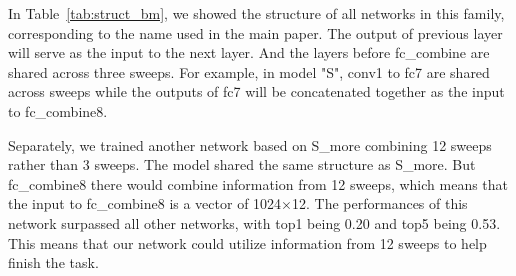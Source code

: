 In Table~\ref{tab:struct_bm}, we showed the structure of all networks in this family, corresponding to the name used in the main paper.
The output of previous layer will serve as the input to the next layer.
And the layers before fc\_combine are shared across three sweeps. For example, in model "S", conv1 to fc7 are shared across sweeps while the outputs of fc7 will be concatenated together as the input to fc\_combine8.

Separately, we trained another network based on S\_more combining 12 sweeps rather than 3 sweeps. The model shared the same structure as S\_more. 
But fc\_combine8 there would combine information from 12 sweeps, which means that the input to fc\_combine8 is a vector of 1024$\times$12. 
The performances of this network surpassed all other networks, with top1 being 0.20 and top5 being 0.53. This means that our network could utilize information from 12 sweeps to help finish the task.

